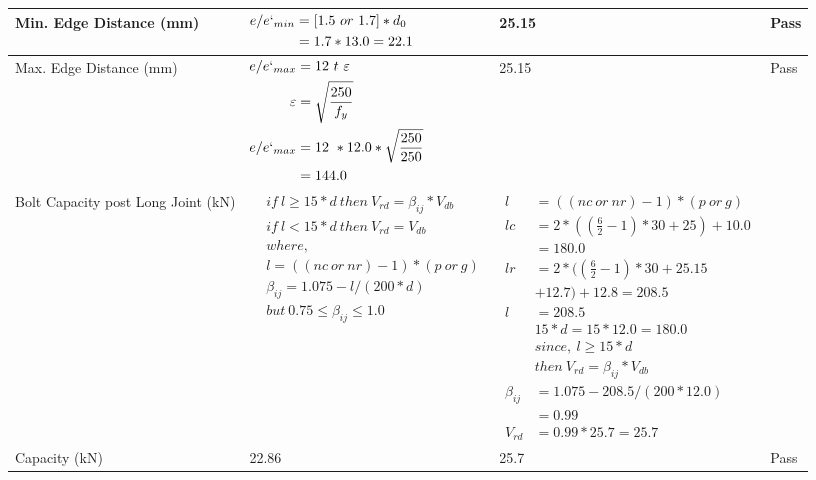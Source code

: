 \documentclass{article}%
\begin{document}
\begin{longtable}{|p{3cm}|p{5.5cm}|p{6cm}|p{1.5cm}|}
\hline%
Min. Edge Distance (mm)&$\begin{aligned}e/e`_{min} &=[1.5~or~ 1.7] * d_0\\ &=1.7*13.0=22.1 \end{aligned}$&25.15&Pass\\%
\hline%
Max. Edge Distance (mm)&$\begin{aligned}e/e`_{max} &= 12~ t~ \varepsilon&\\ \varepsilon &= \sqrt{\frac{250}{f_y}}\\ e/e`_{max}&=12 ~*12.0*\sqrt{\frac{250}{250}}\\ &=144.0\\ \end{aligned}$&25.15&Pass\\%
\hline%
Bolt Capacity post Long Joint (kN)&$\begin{aligned} &if~l\geq 15 * d~then~V_{rd} = \beta_{ij} * V_{db} \\ & if~l < 15 * d~then~V_{rd} = V_{db} \\ & where,\\ & l = ((nc~or~nr) - 1) * (p~or~g) \\ & \beta_{ij} = 1.075 - l/(200 * d) \\ & but~0.75\leq\beta_{ij}\leq1.0 \end{aligned}$&$\begin{aligned} l~&= ((nc~or~nr) - 1) * (p~or~g) \\  lc&= 2*((\frac{6}{2} - 1) * 30+25)+ 10.0\\&=180.0\\  lr&= 2*((\frac{6}{2} - 1) * 30+25.15\\& +12.7)+ 12.8=208.5\\  l~&= 208.5\\ &15 * d = 15 * 12.0 = 180.0 \\ &since,~l \geq 15 * d~\\ &then~V_{rd} = \beta_{ij} * V_{db} \\ \beta_{ij} &= 1.075 - 208.5/(200*12.0)\\& =0.99\\  V_{rd}& = 0.99 * 25.7=25.7 \end{aligned}$&\\%
\hline%
Capacity (kN)&22.86&25.7&Pass\\%
\hline%
\end{longtable}

%
\newpage%
\end{document}
